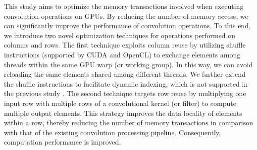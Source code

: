 
This study aims to optimize the memory transactions involved when executing convolution operations on GPUs. By reducing the number of
memory access, we can significantly improve the performance of convolution operations. To this end, we introduce two novel optimization
techniques for operations performed on columns and rows. The first technique exploits column reuse by utilizing shuffle instructions
(supported by CUDA and OpenCL) to exchange elements among threads within the same GPU warp (or working group). In this way, we can avoid
reloading the same elements shared among different threads. We further extend the shuffle instructions to facilitate dynamic indexing,
which is not supported in the previous study \cite{vasilache2014fast}. The second technique targets row reuse by multiplying one input row
with multiple rows of a convolutional kernel (or filter) to compute multiple output elements. This strategy improves the data locality of
elements within a row, thereby reducing the number of memory transactions in comparison with that of the existing convolution processing
pipeline. Consequently, computation performance is improved.



